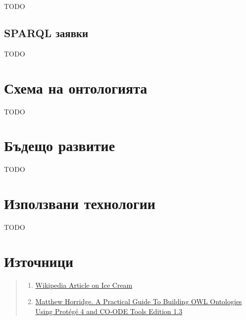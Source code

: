\documentclass[12pt]{article}
\begin{document}
TODO

\subsection{SPARQL заявки}

TODO







\section{Схема на онтологията}

TODO



\section{Бъдещо развитие}

TODO




\section{Използвани технологии}

TODO







\listoffigures

\section{Източници}

\begin{quote}

    \begin{enumerate}
    
    \item \href{https://en.wikipedia.org/wiki/Ice_cream}{Wikipedia Article on Ice Cream}
    
    \item \href{https://www.researchgate.net/publication/272829948_A_Practical_Guide_To_Building_OWL_Ontologies_Using_Protege_4_and_CO-ODE_Tools_Edition_13}{Matthew Horridge. A Practical Guide To Building OWL Ontologies Using Protégé 4 and CO-ODE Tools Edition 1.3}

    
    
    \end{enumerate}

\end{quote}
\end{document}
